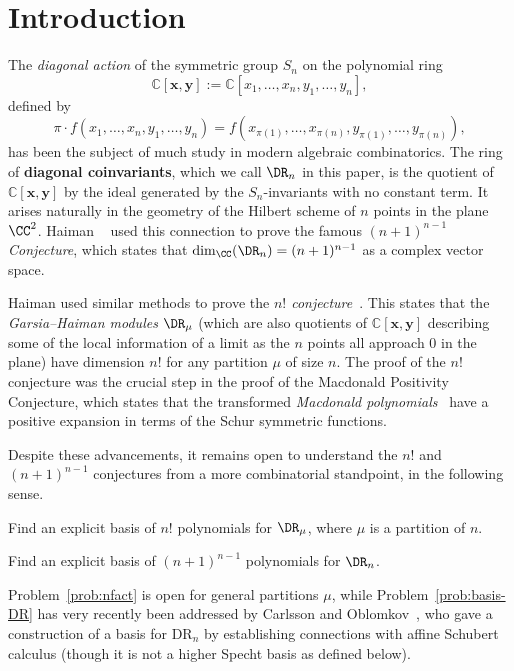 \section{Introduction}

\noindent The \textit{diagonal action} of the symmetric group $S_n$ on the polynomial ring $$\mathbb{C}[\mathbf{x},\mathbf{y}]:=\mathbb{C}[x_1,\ldots,x_n,y_1,\ldots,y_n],$$ defined by $$\pi\cdot  f(x_1,\ldots,x_n,y_1,\ldots,y_n)=f(x_{\pi(1)},\ldots,x_{\pi(n)},y_{\pi(1)},\ldots,y_{\pi(n)}),$$ has been the subject of much study in modern algebraic combinatorics.  The ring of \textbf{diagonal coinvariants}, which we call $\DR_n$ in this paper, is the quotient of $\mathbb{C}[\mathbf{x},\mathbf{y}]$ by the ideal generated by the $S_n$-invariants with no constant term.  It arises naturally in the geometry of the Hilbert scheme of $n$ points in the plane $\CC^2$.  Haiman ~\cite{HaimanDR} used this connection to prove the famous \textit{$(n+1)^{n-1}$ Conjecture}, which states that $\dim_\CC(\DR_n)=(n+1)^{n-1}$ as a complex vector space.  

Haiman used similar methods to prove the \textit{$n!$ conjecture}~\cite{HaimanGeometry}.  This states that the \textit{Garsia--Haiman modules} $\DR_\mu$ (which are also quotients of $\mathbb{C}[\mathbf{x},\mathbf{y}]$ describing some of the local information of a limit as the $n$ points all approach $0$ in the plane) have dimension $n!$ for any partition $\mu$ of size $n$.  The proof of the $n!$ conjecture was the crucial step in the proof of the Macdonald Positivity Conjecture, which states that the transformed \textit{Macdonald polynomials}~\cite{Macdonald} have a positive expansion in terms of the Schur symmetric functions.

Despite these advancements, it remains open to understand the $n!$ and $(n+1)^{n-1}$ conjectures from a more combinatorial standpoint, in the following sense.

\begin{open}\label{prob:nfact}
	Find an explicit basis of $n!$ polynomials for $\DR_\mu$, where $\mu$ is a partition of $n$.
\end{open}

\begin{open}\label{prob:basis-DR}
	Find an explicit basis of $(n+1)^{n-1}$ polynomials for $\DR_n$.
\end{open}

Problem~\ref{prob:nfact} is open for general partitions $\mu$, while Problem~\ref{prob:basis-DR} has very recently been addressed by Carlsson and Oblomkov~\cite{CarlssonOblomkov}, who gave a construction of a basis for $\mathrm{DR}_n$ by establishing connections with affine Schubert calculus (though it is not a higher Specht basis as defined below). 

